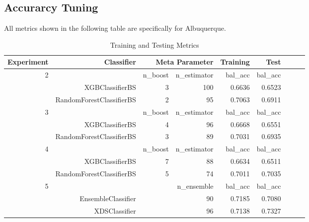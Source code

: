 \documentclass[10pt]{article}
\begin{document}
\subsection{Accurarcy Tuning}
All metrics shown in the following table are specifically for Albuquerque.
\par
\begin{table}[H]
    \caption{Training and Testing Metrics}
    \centering
    \begin{tabular}{|r|r|r|r|r|r|r|r|r|}
        \hline
        Experiment &Classifier &\multicolumn{2}{|r|}{Meta Parameter}
        &Training
        &Test\\
        \hline
        \hline
        2 & &n\_boost &n\_estimator
        &bal\_acc
        &bal\_acc\\
        \hline
        &XGBClassifierBS &3 &100 &0.6636 &0.6523\\
        \hline
        &RandomForestClassifierBS &2 &95 &0.7063 &0.6911\\
        \hline
        \hline
        3 & &n\_boost &n\_estimator
        &bal\_acc
        &bal\_acc\\
        \hline
        &XGBClassifierBS &4 &96 &0.6668 &0.6551\\
        \hline
        &RandomForestClassifierBS &3 &89 &0.7031 &0.6935\\
        \hline
        \hline
        4 & &n\_boost &n\_estimator
        &bal\_acc
        &bal\_acc\\
        \hline
        &XGBClassifierBS &7 &88 &0.6634 &0.6511\\
        \hline
        &RandomForestClassifierBS &5 &74 &0.7011 &0.7035\\
        \hline
        \hline
        5 & &\multicolumn{2}{|r|}{n\_ensemble}
        &bal\_acc
        &bal\_acc\\
        \hline
        &EnsembleClassifier &\multicolumn{2}{|r|}{90} &0.7185 &0.7080\\
        \hline
        &XDSClassifier &\multicolumn{2}{|r|}{96} &0.7138 &0.7327\\
        \hline
    \end{tabular}
\end{table}
\end{document}
